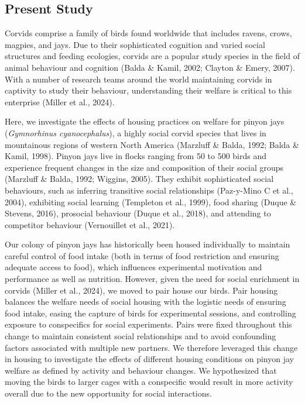 \documentclass[
  pub]{apa6}
\begin{document}
\subsection{Present Study}\label{present-study}

Corvids comprise a family of birds found worldwide that includes ravens, crows, magpies, and jays. Due to their sophisticated cognition and varied social structures and feeding ecologies, corvids are a popular study species in the field of animal behaviour and cognition (Balda \& Kamil, 2002; Clayton \& Emery, 2007). With a number of research teams around the world maintaining corvids in captivity to study their behaviour, understanding their welfare is critical to this enterprise (Miller et al., 2024).

Here, we investigate the effects of housing practices on welfare for pinyon jays (\emph{Gymnorhinus cyanocephalus}), a highly social corvid species that lives in mountainous regions of western North America (Marzluff \& Balda, 1992; Balda \& Kamil, 1998). Pinyon jays live in flocks ranging from 50 to 500 birds and experience frequent changes in the size and composition of their social groups (Marzluff \& Balda, 1992; Wiggins, 2005). They exhibit sophisticated social behaviours, such as inferring transitive social relationships (Paz-y-Mino C et al., 2004), exhibiting social learning (Templeton et al., 1999), food sharing (Duque \& Stevens, 2016), prosocial behaviour (Duque et al., 2018), and attending to competitor behaviour (Vernouillet et al., 2021).

Our colony of pinyon jays has historically been housed individually to maintain careful control of food intake (both in terms of food restriction and ensuring adequate access to food), which influences experimental motivation and performance as well as nutrition. However, given the need for social enrichment in corvids (Miller et al., 2024), we moved to pair house our birds. Pair housing balances the welfare needs of social housing with the logistic needs of ensuring food intake, easing the capture of birds for experimental sessions, and controlling exposure to conspecifics for social experiments. Pairs were fixed throughout this change to maintain consistent social relationships and to avoid confounding factors associated with multiple new partners. We therefore leveraged this change in housing to investigate the effects of different housing conditions on pinyon jay welfare as defined by activity and behaviour changes. We hypothesized that moving the birds to larger cages with a conspecific would result in more activity overall due to the new opportunity for social interactions.
\end{document}
